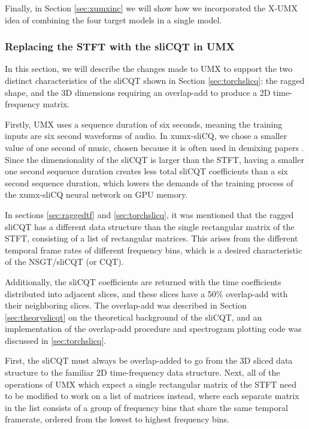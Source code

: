 \documentclass[report.tex]{subfiles}
\begin{document}
Finally, in Section \ref{sec:xumxinc} we will show how we incorporated the X-UMX idea of combining the four target models in a single model.

\subsubsection{Replacing the STFT with the sliCQT in UMX}
\label{sec:replacestft}

In this section, we will describe the changes made to UMX to support the two distinct characteristics of the sliCQT shown in Section \ref{sec:torchslicq}: the ragged shape, and the 3D dimensions requiring an overlap-add to produce a 2D time-frequency matrix.

Firstly, UMX uses a sequence duration of six seconds, meaning the training inputs are six second waveforms of audio. In xumx-sliCQ, we chose a smaller value of one second of music, chosen because it is often used in demixing papers \parencite{plumbley1, plumbley2, demucs}. Since the dimensionality of the sliCQT is larger than the STFT, having a smaller one second sequence duration creates less total sliCQT coefficients than a six second sequence duration, which lowers the demands of the training process of the xumx-sliCQ neural network on GPU memory.

In sections \ref{sec:raggedtf} and \ref{sec:torchslicq}, it was mentioned that the ragged sliCQT has a different data structure than the single rectangular matrix of the STFT, consisting of a list of rectangular matrices. This arises from the different temporal frame rates of different frequency bins, which is a desired characteristic of the NSGT/sliCQT (or CQT).

Additionally, the sliCQT coefficients are returned with the time coefficients distributed into adjacent slices, and these slices have a 50\% overlap-add with their neighboring slices. The overlap-add was described in Section \ref{sec:theoryslicqt} on the theoretical background of the sliCQT, and an implementation of the overlap-add procedure and spectrogram plotting code was discussed in \ref{sec:torchslicq}.

First, the sliCQT must always be overlap-added to go from the 3D sliced data structure to the familiar 2D time-frequency data structure. Next, all of the operations of UMX which expect a single rectangular matrix of the STFT need to be modified to work on a list of matrices instead, where each separate matrix in the list consists of a group of frequency bins that share the same temporal framerate, ordered from the lowest to highest frequency bins.
\end{document}
